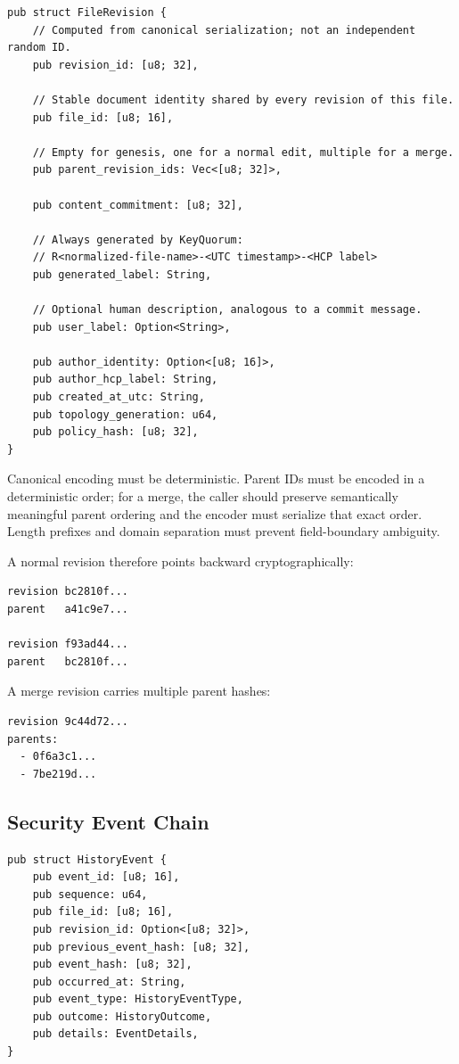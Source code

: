 \documentclass[11pt]{article}
\begin{document}
\begin{lstlisting}
pub struct FileRevision {
    // Computed from canonical serialization; not an independent random ID.
    pub revision_id: [u8; 32],

    // Stable document identity shared by every revision of this file.
    pub file_id: [u8; 16],

    // Empty for genesis, one for a normal edit, multiple for a merge.
    pub parent_revision_ids: Vec<[u8; 32]>,

    pub content_commitment: [u8; 32],

    // Always generated by KeyQuorum:
    // R<normalized-file-name>-<UTC timestamp>-<HCP label>
    pub generated_label: String,

    // Optional human description, analogous to a commit message.
    pub user_label: Option<String>,

    pub author_identity: Option<[u8; 16]>,
    pub author_hcp_label: String,
    pub created_at_utc: String,
    pub topology_generation: u64,
    pub policy_hash: [u8; 32],
}
\end{lstlisting}

Canonical encoding must be deterministic. Parent IDs must be encoded in a deterministic order; for a merge, the caller should preserve semantically meaningful parent ordering and the encoder must serialize that exact order. Length prefixes and domain separation must prevent field-boundary ambiguity.

A normal revision therefore points backward cryptographically:

\begin{lstlisting}
revision bc2810f...
parent   a41c9e7...

revision f93ad44...
parent   bc2810f...
\end{lstlisting}

A merge revision carries multiple parent hashes:

\begin{lstlisting}
revision 9c44d72...
parents:
  - 0f6a3c1...
  - 7be219d...
\end{lstlisting}

\subsection{Security Event Chain}
\begin{lstlisting}
pub struct HistoryEvent {
    pub event_id: [u8; 16],
    pub sequence: u64,
    pub file_id: [u8; 16],
    pub revision_id: Option<[u8; 32]>,
    pub previous_event_hash: [u8; 32],
    pub event_hash: [u8; 32],
    pub occurred_at: String,
    pub event_type: HistoryEventType,
    pub outcome: HistoryOutcome,
    pub details: EventDetails,
}
\end{lstlisting}
\end{document}
